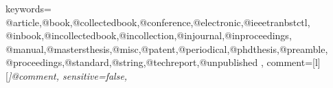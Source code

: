 





  {keywords={%
      @article,@book,@collectedbook,@conference,@electronic,@ieeetranbstctl,%
      @inbook,@incollectedbook,@incollection,@injournal,@inproceedings,%
      @manual,@mastersthesis,@misc,@patent,@periodical,@phdthesis,@preamble,%
      @proceedings,@standard,@string,@techreport,@unpublished%
      },
   comment=[l][\itshape]{@comment},
   sensitive=false,
  }
